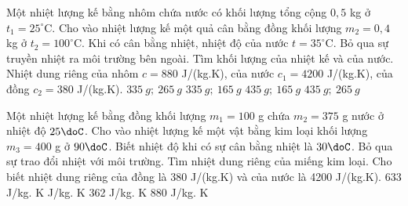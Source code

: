 \begin{vidu}%
	Một nhiệt lượng kế bằng nhôm chứa nước có khối lượng tổng cộng $0,5$ kg ở $t_1 = 25^{\circ}$C. Cho vào nhiệt lượng kế một quả cân bằng đồng khối lượng $m_2 = 0,4$ kg ở $t_2 = 100^{\circ}$C. Khi có cân bằng nhiệt, nhiệt độ của nước $t = 35^{\circ}$C. Bỏ qua sự truyền nhiệt ra môi trường bên ngoài. Tìm khối lượng của nhiệt kế và của nước. Nhiệt dung riêng của nhôm $c = 880$ J/(kg.K), của nước $c_1 = 4200$ J/(kg.K), của đồng $c_2 = 380$ J/(kg.K).
	\choice
	{$335\ g;\ 265\ g$}
	{\True $335\ g;\ 165\ g$}
	{$435\ g;\ 165\ g$}
	{$435\ g;\ 265\ g$}
\end{vidu}
\begin{vidu}%
	Một nhiệt lượng kế bằng đồng khối lượng $m_1 = 100$ g chứa $m_2 = 375$ g nước ở nhiệt độ $25\doC$. Cho vào nhiệt lượng kế một vật bằng kim loại khối lượng $m_3 = 400$ g ở $90\doC$. Biết nhiệt độ khi có sự cân bằng nhiệt là $30\doC$. Bỏ qua sự trao đổi nhiệt với môi trường. Tìm nhiệt dung riêng của miếng kim loại. Cho biết nhiệt dung riêng của đồng là 380 J/(kg.K) và của nước là 4200 J/(kg.K).
	\choice
	{633 J/kg. K}
	{ J/kg. K}
	{362 J/kg. K}
	{880 J/kg. K}
\end{vidu}

